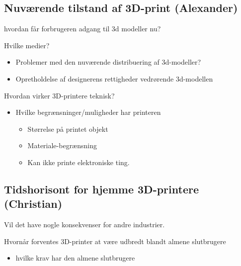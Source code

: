 \subsection{Nuværende tilstand af 3D-print (Alexander)} %
\label{sub:nuv_rende_tilstand_af_3d_print_alexander_}

hvordan får forbrugeren adgang til 3d modeller nu?

Hvilke medier?

\begin{itemize}
	\item Problemer med den nuværende distribuering af 3d-modeller?
	\item Opretholdelse af designerens rettigheder vedrørende 3d-modellen
\end{itemize}



Hvordan virker 3D-printere teknisk?

\begin{itemize}
	\item Hvilke begrænsninger/muligheder har printeren
	\begin{itemize}
		\item Størrelse på printet objekt
		\item Materiale-begrænsning
		\item Kan ikke printe elektroniske ting.
	\end{itemize}
\end{itemize}



\subsection{Tidshorisont for hjemme 3D-printere (Christian)} %
\label{sub:tidshorisont_for_hjemme_3d_printere_senere_}

Vil det have nogle konsekvenser for andre industrier.

Hvornår forventes 3D-printer at være udbredt blandt almene slutbrugere

\begin{itemize}
	\item hvilke krav har den almene slutbrugere
\end{itemize}



